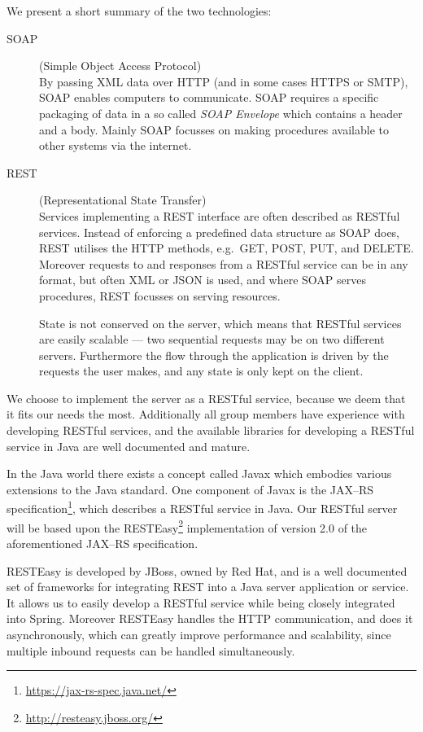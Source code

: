 We present a short summary of the two technologies:
\begin{description}
    \item[SOAP] (Simple Object Access Protocol)\cite{SOAP_spec}\hfill\\
        By passing XML data over HTTP (and in some cases HTTPS or SMTP), SOAP enables computers to communicate.
        SOAP requires a specific packaging of data in a so called \textit{SOAP Envelope} which contains a header and a body.
        Mainly SOAP focusses on making procedures available to other systems via the internet.
    \item[REST] (Representational State Transfer)\cite{RESTful_best_practices}\hfill\\
        Services implementing a REST interface are often described as RESTful services.
        Instead of enforcing a predefined data structure as SOAP does, REST utilises the HTTP methods, e.g.~GET, POST, PUT, and DELETE.
        Moreover requests to and responses from a RESTful service can be in any format, but often XML or JSON is used,
        and where SOAP serves procedures, REST focusses on serving resources.

        State is not conserved on the server, which means that RESTful services are easily scalable --- two sequential requests may be on two different servers.
        Furthermore the flow through the application is driven by the requests the user makes, and any state is only kept on the client.
\end{description}

We choose to implement the server as a RESTful service, because we deem that it fits our needs the most.
Additionally all group members have experience with developing RESTful services, and the available libraries for developing a RESTful service in Java are well documented and mature.

\bigskip
In the Java world there exists a concept called Javax which embodies various extensions to the Java standard.
One component of Javax is the JAX--RS specification\footnote{\url{https://jax-rs-spec.java.net/}}, which describes a RESTful service in Java.
Our RESTful server will be based upon the RESTEasy\footnote{\url{http://resteasy.jboss.org/}} implementation of version 2.0 of the aforementioned JAX--RS specification.

RESTEasy is developed by JBoss, owned by Red Hat, and is a well documented set of frameworks for integrating REST into a Java server application or service.
It allows us to easily develop a RESTful service while being closely integrated into Spring.
Moreover RESTEasy handles the HTTP communication, and does it asynchronously, which can greatly improve performance and scalability,
since multiple inbound requests can be handled simultaneously.

